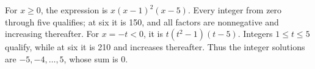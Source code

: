 For $x\ge0$, the expression is $x(x-1)^2(x-5)$. Every integer from zero through five qualifies; at six it is 150, and all factors are nonnegative and increasing thereafter. For $x=-t<0$, it is $t(t^2-1)(t-5)$. Integers $1\le t\le5$ qualify, while at six it is 210 and increases thereafter. Thus the integer solutions are $-5,-4,\ldots,5$, whose sum is $\boxed0$.
